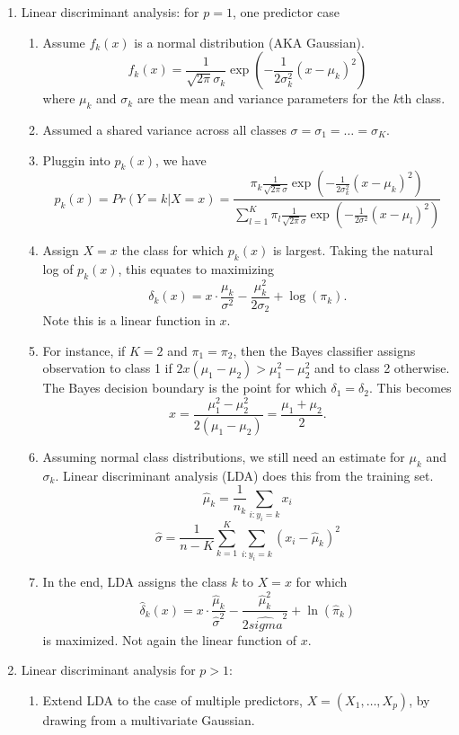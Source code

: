 \documentclass{article}
\begin{document}
\begin{enumerate}
\item Linear discriminant analysis: for $p=1$, one predictor case
\begin{enumerate}
\item Assume $f_k(x)$ is a normal distribution (AKA Gaussian).
\[
f_k(x) = \frac{1}{\sqrt{2\pi}\sigma_k} \exp \left(-\frac{1}{2\sigma_k^2} (x-\mu_k)^2 \right)
\]
where $\mu_k$ and $\sigma_k$ are the mean and variance parameters for the $k$th class.
\item Assumed a shared variance across all classes $\sigma = \sigma_1 = \dots = \sigma_K$.
\item Pluggin into $p_k(x)$, we have
\[
p_k(x) = Pr(Y=k | X=x) = \frac{\pi_k \frac{1}{\sqrt{2\pi}\sigma} \exp \left(-\frac{1}{2\sigma_k^2} (x-\mu_k)^2 \right)}{\sum_{l=1}^K \pi_l \frac{1}{\sqrt{2\pi}\sigma} \exp \left(-\frac{1}{2\sigma^2} (x-\mu_l)^2 \right)}
\]
\item Assign $X=x$ the class for which $p_k(x)$ is largest. Taking the natural log of $p_k(x)$, this equates to maximizing
\[
\delta_k(x) = x \cdot \frac{\mu_k}{\sigma^2} - \frac{\mu_k^2}{2\sigma_2}+ \log(\pi_k). 
\]
Note this is a linear function in $x$.
\item For instance, if $K=2$ and $\pi_1=\pi_2$, then the Bayes classifier assigns observation to class 1 if $2x(\mu_1-\mu_2)>\mu_1^2 - \mu_2^2$ and to class 2 otherwise. The Bayes decision boundary is the point for which $\delta_1 = \delta_2$. This becomes
\[
x = \frac{\mu_1^2 - \mu_2^2}{2(\mu_1-\mu_2)} = \frac{\mu_1+\mu_2}{2}.
\]
\item Assuming normal class distributions, we still need an estimate for $\mu_k$ and $\sigma_k$. Linear discriminant analysis (LDA) does this from the training set.
\[
\hat{\mu}_k = \frac{1}{n_k} \sum_{i:y_i=k} x_i
\]
\[
\hat{\sigma} = \frac{1}{n-K} \sum_{k=1}^K \sum_{i:y_i=k} (x_i - \hat{\mu}_k)^2
\]
\item In the end, LDA assigns the class $k$ to $X=x$ for which 
\[
\hat{\delta}_k(x) = x \cdot \frac{\hat{\mu}_k}{\hat{\sigma}^2} - \frac{\hat{\mu}_k^2}{2\hat{sigma}^2} + \ln(\hat{\pi}_k)
\]
is maximized. Not again the linear function of $x$.
\end{enumerate}

\item Linear discriminant analysis for $p>1$:

\begin{enumerate}
\item Extend LDA to the case of multiple predictors, $X=(X_1, \dots, X_p)$, by drawing from a multivariate Gaussian.


\end{enumerate}
\end{enumerate}
\end{document}
